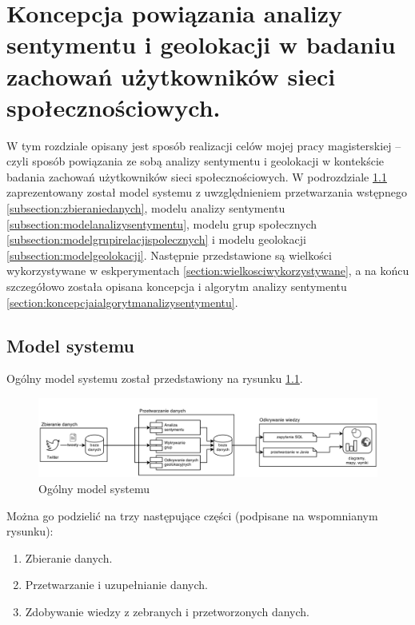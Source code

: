 \chapter{Koncepcja powiązania analizy sentymentu i geolokacji w badaniu
zachowań użytkowników sieci społecznościowych.}
\label{chapter:koncepcjarozwiazania}

W tym rozdziale opisany jest sposób realizacji celów mojej pracy magisterskiej
-- czyli sposób powiązania ze sobą analizy sentymentu i geolokacji w kontekście
badania zachowań użytkowników sieci społecznościowych. W podrozdziale
\ref{section:modelsystemu} zaprezentowany został model systemu z uwzględnieniem
przetwarzania wstępnego \ref{subsection:zbieraniedanych}, modelu analizy
sentymentu \ref{subsection:modelanalizysentymentu}, modelu grup społecznych
\ref{subsection:modelgrupirelacjispolecznych} i modelu geolokacji
\ref{subsection:modelgeolokacji}. Następnie przedstawione są wielkości
wykorzystywane w eskperymentach \ref{section:wielkosciwykorzystywane}, a na
końcu szczegółowo została opisana koncepcja i algorytm analizy sentymentu
\ref{section:koncepcjaialgorytmanalizysentymentu}.



\section{Model systemu}
\label{section:modelsystemu}
Ogólny model systemu został przedstawiony na rysunku \ref{image:model-systemu}.

\begin{figure}[ht!]
\centering
\includegraphics[width=160mm]{img/gruby-model.png}
\caption{Ogólny model systemu}
\label{image:model-systemu}
\end{figure}


Można go podzielić na trzy następujące części (podpisane na wspomnianym
rysunku):
\begin{enumerate}
  \item Zbieranie danych.
  \item Przetwarzanie i uzupełnianie danych.
  \item Zdobywanie wiedzy z zebranych i przetworzonych danych.
\end{enumerate}



